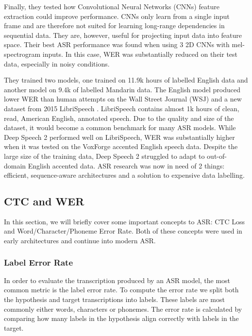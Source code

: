 Finally, they tested how Convolutional Neural Networks (CNNs) \cite{lecuncnn1998} feature extraction could improve performance. CNNs only learn from a single input frame and are therefore not suited for learning long-range dependencies in sequential data. They are, however, useful for projecting input data into feature space. Their best ASR performance was found when using 3 2D CNNs with mel-spectrogram inputs. In this case, WER was substantially reduced on their test data, especially in noisy conditions.


They trained two models, one trained on 11.9k hours of labelled English data and another model on 9.4k of labelled Mandarin data. The English model produced lower WER than human attempts on the Wall Street Journal (WSJ) \cite{paul1992design} and a new dataset from 2015 LibriSpeech \cite{librispeech}. LibriSpeech contains almost 1k hours of clean, read, American English, annotated speech. Due to the quality and size of the dataset, it would become a common benchmark for many ASR models. While Deep Speech 2 performed well on LibriSpeech, WER was substantially higher when it was tested on the VoxForge accented English speech data. Despite the large size of the training data, Deep Speech 2 struggled to adapt to out-of-domain English accented data. ASR research was now in need of 2 things: efficient, sequence-aware architectures and a solution to expensive data labelling.


\subsection{CTC and WER}\label{lr_subsec:ctc_were}
In this section, we will briefly cover some important concepts to ASR: CTC Loss and Word/Character/Phoneme Error Rate. Both of these concepts were used in early architectures and continue into modern ASR. %

\subsubsection{Label Error Rate}
In order to evaluate the transcription produced by an ASR model, the most common metric is the label error rate. To compute the error rate we split both the hypothesis and target transcriptions into labels. These labels are most commonly either words, characters or phonemes. The error rate is calculated by comparing how many labels in the hypothesis align correctly with labels in the target.

